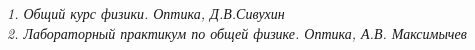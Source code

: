 \documentclass[a4paper]{article}
\begin{document}
\begin{multicols}{2}
\begin{enumerate}
 \end{enumerate}
 \textit{1. Общий курс физики. Оптика, Д.В.Сивухин}\\
\textit{2. Лабораторный практикум по общей физике. Оптика, А.В. Максимычев}\\
\end{multicols}
\end{document}
